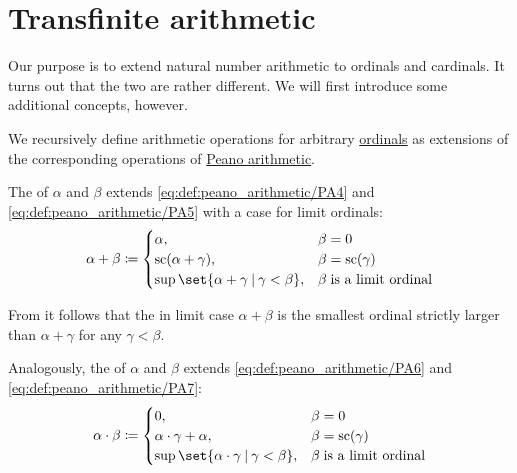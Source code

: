 \section{Transfinite arithmetic}\label{sec:transfinite_arithmetic}

Our purpose is to extend natural number arithmetic to ordinals and cardinals. It turns out that the two are rather different. We will first introduce some additional concepts, however.

\begin{definition}\label{def:ordinal_arithmetic}
  We recursively define arithmetic operations for arbitrary \hyperref[def:ordinal]{ordinals} as extensions of the corresponding operations of \hyperref[def:peano_arithmetic]{Peano arithmetic}.

  \begin{thmenum}
     The  of \( \alpha \) and \( \beta \) extends \eqref{eq:def:peano_arithmetic/PA4} and \eqref{eq:def:peano_arithmetic/PA5} with a case for limit ordinals:
    \begin{equation}\label{eq:def:ordinal_arithmetic/addition}
      \alpha + \beta \coloneqq \begin{cases}
        \alpha,                                            &\beta = 0 \\
        \op{sc}(\alpha + \gamma),                        &\beta = \op{sc}(\gamma) \\
        \sup\set{ \alpha + \gamma \given \gamma < \beta }, &\beta \T{is a limit ordinal} \\
      \end{cases}
    \end{equation}

    From  it follows that the in limit case \( \alpha + \beta \) is the smallest ordinal strictly larger than \( \alpha + \gamma \) for any \( \gamma < \beta \).

     Analogously, the  of \( \alpha \) and \( \beta \) extends \eqref{eq:def:peano_arithmetic/PA6} and \eqref{eq:def:peano_arithmetic/PA7}:
    \begin{equation}\label{eq:def:ordinal_arithmetic/multiplication}
      \alpha \cdot \beta \coloneqq \begin{cases}
        0,                                                     &\beta = 0 \\
        \alpha \cdot \gamma + \alpha,                          &\beta = \op{sc}(\gamma) \\
        \sup\set{ \alpha \cdot \gamma \given \gamma < \beta }, &\beta \T{is a limit ordinal} \\
      \end{cases}
    \end{equation}


\end{thmenum}
\end{definition}
